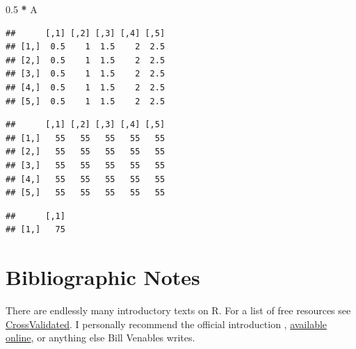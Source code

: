 \documentclass[]{book}
\newenvironment{Shaded}{\begin{snugshade}}{\end{snugshade}}
\newcommand{\KeywordTok}[1]{\textcolor[rgb]{0.13,0.29,0.53}{\textbf{#1}}}
\newcommand{\FloatTok}[1]{\textcolor[rgb]{0.00,0.00,0.81}{#1}}
\newcommand{\StringTok}[1]{\textcolor[rgb]{0.31,0.60,0.02}{#1}}
\newcommand{\CommentTok}[1]{\textcolor[rgb]{0.56,0.35,0.01}{\textit{#1}}}
\newcommand{\OperatorTok}[1]{\textcolor[rgb]{0.81,0.36,0.00}{\textbf{#1}}}
\newcommand{\NormalTok}[1]{#1}
\theoremstyle{definition}
\theoremstyle{definition}
\theoremstyle{definition}
\theoremstyle{remark}
\begin{document}
\begin{Shaded}
\begin{Highlighting}[]
\FloatTok{0.5} \OperatorTok{*}\StringTok{ }\NormalTok{A }
\end{Highlighting}
\end{Shaded}

\begin{verbatim}
##      [,1] [,2] [,3] [,4] [,5]
## [1,]  0.5    1  1.5    2  2.5
## [2,]  0.5    1  1.5    2  2.5
## [3,]  0.5    1  1.5    2  2.5
## [4,]  0.5    1  1.5    2  2.5
## [5,]  0.5    1  1.5    2  2.5
\end{verbatim}

\begin{Shaded}
\end{Shaded}

\begin{verbatim}
##      [,1] [,2] [,3] [,4] [,5]
## [1,]   55   55   55   55   55
## [2,]   55   55   55   55   55
## [3,]   55   55   55   55   55
## [4,]   55   55   55   55   55
## [5,]   55   55   55   55   55
\end{verbatim}

\begin{Shaded}
\end{Shaded}

\begin{verbatim}
##      [,1]
## [1,]   75
\end{verbatim}

\section{Bibliographic Notes}\label{bibliographic-notes-1}

There are endlessly many introductory texts on R. For a list of free
resources see
\href{http://stats.stackexchange.com/questions/138/free-resources-for-learning-r}{CrossValidated}.
I personally recommend the official introduction
\citet{venables2004introduction},
\href{https://cran.r-project.org/doc/manuals/r-release/R-intro.pdf}{available
online}, or anything else Bill Venables writes.
\end{document}
